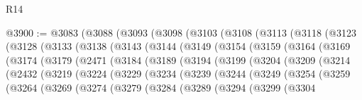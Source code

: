 \begin{lexlean}{R14}
\begin{coremodule}
@3900 := @3083
    (@3088
      (@3093
        (@3098
          (@3103
            (@3108
              (@3113
                (@3118
                  (@3123
                    (@3128
                      (@3133
                        (@3138
                          (@3143
                            (@3144
                              (@3149
                                (@3154
                                  (@3159
                                    (@3164
                                      (@3169
                                        (@3174
                                          (@3179
                                            (@2471
                                              (@3184
                                                (@3189
                                                  (@3194
                                                    (@3199
                                                      (@3204
                                                        (@3209
                                                          (@3214
                                                            (@2432
                                                              (@3219
                                                                (@3224
                                                                  (@3229
                                                                    (@3234
                                                                      (@3239
                                                                        (@3244
                                                                          (@3249
                                                                            (@3254
                                                                              (@3259
                                                                                (@3264
                                                                                  (@3269
                                                                                    (@3274
                                                                                      (@3279
                                                                                        (@3284
                                                                                          (@3289
                                                                                            (@3294
                                                                                              (@3299
                                                                                                (@3304

\end{coremodule}
\end{lexlean}
